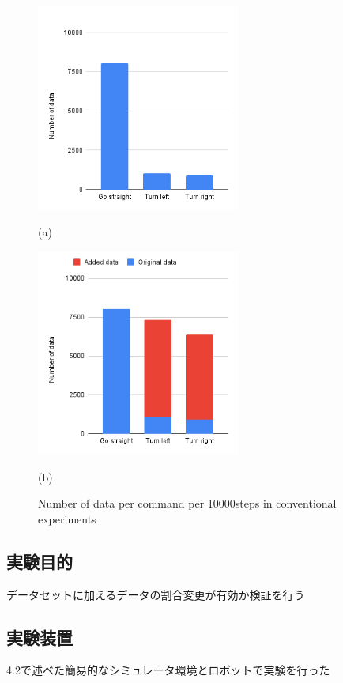 \begin{figure}[h]
  \centering
  \begin{minipage}[b]{67mm}
    \centering
    \includegraphics[width=67mm]{images/hist_change_org.png}
    \caption*{(a)}
  \end{minipage} 
  \begin{minipage}[b]{67mm}
    \centering
    \includegraphics[width=67mm]{images/hist_change_times7.png}
    \caption*{(b)}
  \end{minipage}
  \caption{Number of data per command per 10000steps in conventional experiments}
  \label{Fig:hist}
\end{figure}

  \subsection{実験目的}
  データセットに加えるデータの割合変更が有効か検証を行う
  \subsection{実験装置}
  4.2で述べた簡易的なシミュレータ環境とロボットで実験を行った
